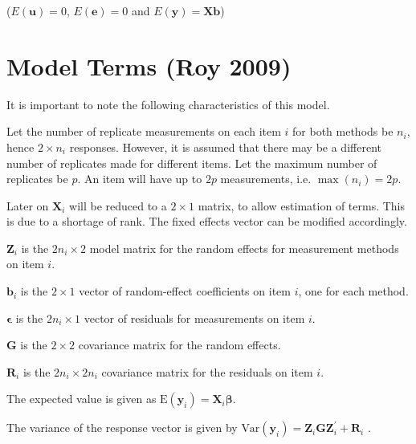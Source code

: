 \documentclass[12pt, a4paper]{report}
\theoremstyle{plain}
\theoremstyle{definition}
\theoremstyle{remark}
\begin{document}
($E(\textbf{u})=0$, $E(\textbf{e})=0 $ and $E(\textbf{y}) =
\textbf{Xb}$)


\section{Model Terms (Roy 2009)}
It is important to note the following characteristics of this model.

Let the number of replicate measurements on each item $i$ for both methods be $n_i$, hence $2 \times n_i$ responses. However, it is assumed that there may be a different number of replicates made for different items. Let the maximum number of replicates be $p$. An item will have up to $2p$ measurements, i.e. $\max(n_{i}) = 2p$.


Later on $\boldsymbol{X}_i$ will be reduced to a $2 \times 1$ matrix, to allow estimation of terms. This is due to a shortage of rank. The fixed effects vector can be modified accordingly.

$\boldsymbol{Z}_i$ is the $2n_i \times  2$ model matrix for the random effects for measurement methods on item $i$.\\
\bigskip

$\boldsymbol{b}_i$ is the $2 \times  1$ vector of random-effect coefficients on item $i$, one for each method.

$\boldsymbol{\epsilon}$  is the $2n_i \times  1$ vector of residuals for measurements on item $i$.\\
\bigskip

$\boldsymbol{G}$ is the $2 \times  2$ covariance matrix for the random effects.

$\boldsymbol{R}_i$ is the $2n_i \times  2n_i$ covariance matrix for the residuals on item $i$.

The expected value is given as $\mbox{E}(\boldsymbol{y}_i) = \boldsymbol{X}_i\boldsymbol{\beta}.$ \citep{hamlett}\\
\bigskip

The variance of the response vector is given by $\mbox{Var}(\boldsymbol{y}_i)  = \boldsymbol{Z}_i \boldsymbol{G} \boldsymbol{Z}_i^{\prime} + \boldsymbol{R}_i$ \citep{hamlett}.
\end{document}
